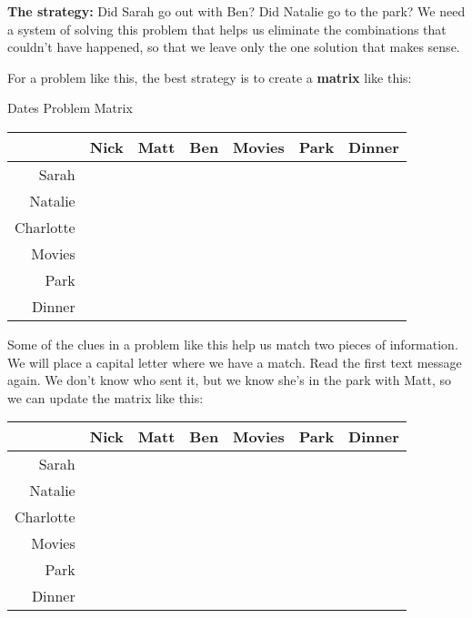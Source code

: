 \textbf{The strategy:}  Did Sarah go out with Ben?  Did Natalie go to the park?  We need a system of solving this problem that helps us eliminate the combinations that couldn't have happened, so that we leave only the one solution that makes sense.

For a problem like this, the best strategy is to create a \textbf{matrix} like this:

\begin{myfigure}[label=fig:datesmatrix]{Dates Problem Matrix}
    \begin{tcolorbox}[width=\textwidth,colback=black!10]
        \begin{center}
            \begin{tabular}{r|c|c|c||c|c|c|}
                & Nick & Matt & Ben & Movies & Park & Dinner\\
                \hline\hline
                Sarah & & & & & & \\
                \hline
                Natalie & & & & & &\\
                \hline
                Charlotte & & & & & & \\
                \hline\hline
                Movies & & & \\
                \cline{1-4}
                Park & & & \\
                \cline{1-4}
                Dinner & & &\\
                \cline{1-4}
            \end{tabular}
        \end{center}
    \end{tcolorbox}
\end{myfigure}

Some of the clues in a problem like this help us match two pieces of information.  We will place a capital letter \mO{} where we have a match.  Read the first text message again.  We don't know who sent it, but we know she's in the park with Matt, so we can update the matrix like this:

\begin{tcolorbox}[width=\textwidth,colback=black!10]
    \begin{center}
        \begin{tabular}{r|c|c|c||c|c|c|}
            & Nick & Matt & Ben & Movies & Park & Dinner\\
            \hline\hline
            Sarah & & & & & & \\
            \hline
            Natalie & & & & & &\\
            \hline
            Charlotte & & & & & & \\
            \hline\hline
            Movies & & & \\
            \cline{1-4}
            Park & & \mO{} & \\
            \cline{1-4}
            Dinner & & &\\
            \cline{1-4}
        \end{tabular}
    \end{center}
\end{tcolorbox}

